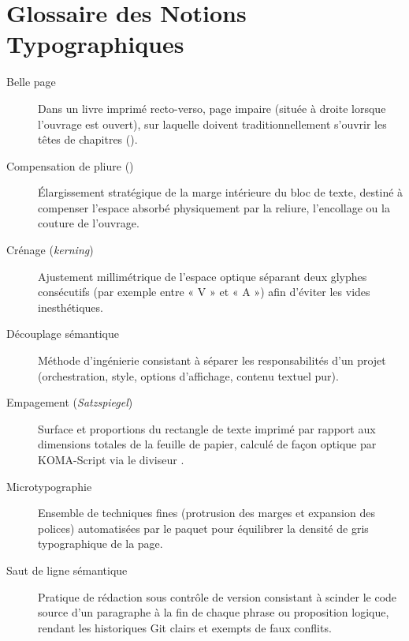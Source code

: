 \vspace{1.2cm}

\section*{Glossaire des Notions Typographiques}

\begin{description}
  \item[Belle page] Dans un livre imprimé recto-verso, page impaire (située à droite lorsque l'ouvrage est ouvert),
  sur laquelle doivent traditionnellement s'ouvrir les têtes de chapitres ().
  \item[Compensation de pliure ()] Élargissement stratégique de la marge intérieure du bloc de texte,
  destiné à compenser l'espace absorbé physiquement par la reliure, l'encollage ou la couture de l'ouvrage.
  \item[Crénage (\textit{kerning})] Ajustement millimétrique de l'espace optique séparant deux glyphes consécutifs
  (par exemple entre « V » et « A ») afin d'éviter les vides inesthétiques.
  \item[Découplage sémantique] Méthode d'ingénierie consistant à séparer les responsabilités
  d'un projet (orchestration, style, options d'affichage, contenu textuel pur).
  \item[Empagement (\textit{Satzspiegel})] Surface et proportions du rectangle de texte imprimé par rapport aux dimensions
  totales de la feuille de papier, calculé de façon optique par KOMA-Script via le diviseur .
  \item[Microtypographie] Ensemble de techniques fines (protrusion des marges et expansion des polices)
  automatisées par le paquet  pour équilibrer la densité de gris typographique de la page.
  \item[Saut de ligne sémantique] Pratique de rédaction sous contrôle de version consistant
  à scinder le code source d'un paragraphe à la fin de chaque phrase ou proposition logique,
  rendant les historiques Git clairs et exempts de faux conflits.
\end{description}
